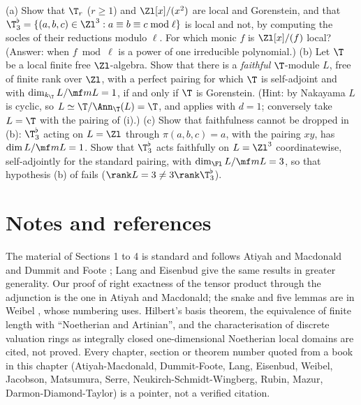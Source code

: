 \begin{exercise}\label{ex:modules:ex-gorenstein}
(a) Show that $\T_r$ ($r\ge1$) and $\Zl[x]/(x^2)$ are local and Gorenstein, and that $\T^\flat_3=\{(a,b,c)\in\Zl^3:a\equiv b\equiv c\bmod\ell\}$ is local and not, by
computing the socles of their reductions modulo $\ell$. For which monic $f$ is $\Zl[x]/(f)$ local? (Answer: when $f\bmod\ell$ is a power of one irreducible
polynomial.)
(b) Let $\T$ be a local finite free $\Zl$-algebra. Show that there is a \emph{faithful} $\T$-module $L$, free of finite rank over $\Zl$, with a perfect pairing
for which $\T$ is self-adjoint and with $\dim_{k_\T}L/\mf mL=1$, if and only if $\T$ is Gorenstein. (Hint: by Nakayama $L$ is cyclic, so
$L\simeq\T/\Ann_\T(L)=\T$, and  applies with $d=1$; conversely take $L=\T$ with the pairing of
(i).)
(c) Show that faithfulness cannot be dropped in (b): $\T^\flat_3$ acting on $L=\Zl$ through $\pi(a,b,c)=a$, with the pairing $xy$, has $\dim L/\mf mL=1$. Show that
$\T^\flat_3$ acts faithfully on $L=\Zl^3$ coordinatewise, self-adjointly for the standard pairing, with $\dim_{\Fl}L/\mf mL=3$, so that hypothesis (b) of
 fails ($\rank L=3\ne3\rank\T^\flat_3$).
\end{exercise}

\section{Notes and references}\label{sec:modules:notes}

The material of Sections 1 to 4 is standard and follows Atiyah and Macdonald \cite[Chapters 1 to 3, 6, 7]{AtiyahMacdonald} and Dummit and Foote
\cite[Chapters 10 and 12]{DummitFoote}; Lang \cite[Chapters III and X]{Lang} and Eisenbud \cite[Chapters 2 to 4]{Eisenbud} give the same results in
greater generality. Our proof of right exactness of the tensor product through the adjunction is the one in Atiyah and Macdonald; the snake and five lemmas
are in Weibel \cite[Section 1.3]{Weibel}, whose numbering  uses. Hilbert's basis theorem, the equivalence of finite length with
``Noetherian and Artinian'', and the characterisation of discrete valuation rings as integrally closed one-dimensional Noetherian local domains are
cited, not proved. Every chapter, section or theorem number quoted from a book in this chapter (Atiyah-Macdonald, Dummit-Foote, Lang,
Eisenbud, Weibel, Jacobson, Matsumura, Serre, Neukirch-Schmidt-Wingberg, Rubin, Mazur, Darmon-Diamond-Taylor) is a pointer, not a verified citation.

